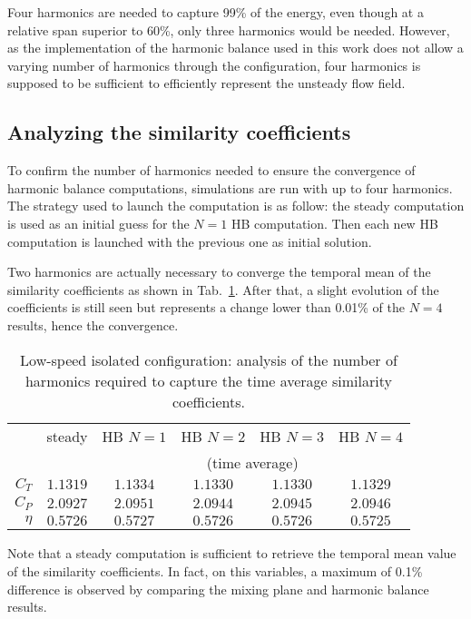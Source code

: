 Four harmonics are needed to capture 99\% of the energy, even though
at a relative span superior to 60\%, only three harmonics would be needed.
However, as the implementation of the harmonic balance used
in this work does not allow a varying number of harmonics through the
configuration, four harmonics is supposed to be sufficient to efficiently 
represent the unsteady flow field.

\subsection{Analyzing the similarity coefficients}
\label{sub:dream_ls_conv_hb_sim_coeff}
To confirm the number of harmonics needed to ensure the convergence
of harmonic balance computations, simulations are run with up to four
harmonics. The strategy used to launch the computation is as follow:
the steady computation is used as an initial guess for the $N=1$ HB computation.
Then each new HB computation is launched with the previous one as initial
solution.

Two harmonics are actually necessary to converge the temporal mean 
of the similarity coefficients as shown 
in Tab.~\ref{tab:dream_ls_hb_conv_sim}. After that, a slight evolution of the
coefficients is still seen but represents a change lower than 0.01\%
of the $N=4$ results, hence the convergence. 
\begin{table}[htp]
   \centering
  \begin{tabular}{rc|cccc}
    \toprule
    & steady & HB $N=1$ & HB $N=2$ & HB $N=3$ & HB $N=4$ \\
    & & \multicolumn{4}{c}{\small (time average)} \\
    \midrule
    $C_T$  & $1.1319$ & $1.1334$ & $1.1330$ & $1.1330$ & $1.1329$ \\
    $C_P$  & $2.0927$ & $2.0951$ & $2.0944$ & $2.0945$ & $2.0946$ \\
    $\eta$ & $0.5726$ & $0.5727$ & $0.5726$ & $0.5726$ & $0.5725$ \\
    \bottomrule
  \end{tabular}
  \caption{Low-speed isolated configuration: analysis of the number of harmonics
  required to capture the time average similarity coefficients.}
  \label{tab:dream_ls_hb_conv_sim}
\end{table}
Note that a steady computation is sufficient to retrieve
the temporal mean value of the similarity coefficients.
In fact, on this variables, a maximum of 0.1\% difference is observed by
comparing the mixing plane and harmonic balance results.

